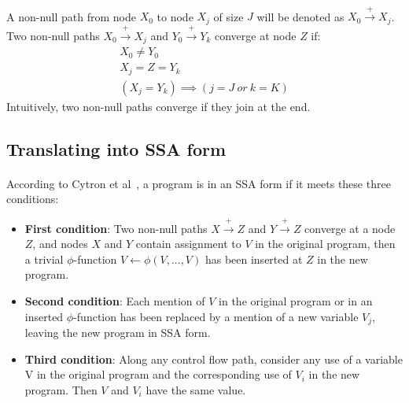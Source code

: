 \paragraph{}
A non-null path from node $X_0$ to node $X_j$ of size $J$ will be denoted as $X_0 \stackrel{+}\rightarrow X_j$. Two non-null paths $X_0\stackrel{+}\rightarrow X_j$ and $ Y_0\stackrel{+}\rightarrow Y_k$ converge at node $Z$ if:
\begin{gather*} 
X_0 \neq Y_0 \\
X_j = Z = Y_k \\
(X_j = Y_k) \implies (j = J\ or\ k = K)
\end{gather*}
Intuitively, two non-null paths converge if they join at the end.

\subsection{Translating into SSA form}
\paragraph{}
According to Cytron et al~\cite{cytron1991efficiently}, a program is in an SSA form if it meets these three conditions:
\begin{itemize}
	\item \textbf{First condition}: Two non-null paths $X\stackrel{+}\rightarrow Z$ and $Y\stackrel{+}\rightarrow Z$ converge at a node $Z$, and nodes $X$ and $Y$ contain assignment to $V$ in the original program, then a trivial $\phi$-function $V\leftarrow \phi(V, ..., V)$ has been inserted at $Z$ in the new program.
	\item \textbf{Second condition}: Each mention of $V$ in the original program or in an inserted $\phi$-function has been replaced by a mention of a new variable $V_j$, leaving the new program in SSA form.
	\item \textbf{Third condition}: Along any control flow path, consider any use of a variable V in the original program and the corresponding use of $V_i$ in the new program. Then $V$ and $V_i$ have the same value.
\end{itemize}
	
